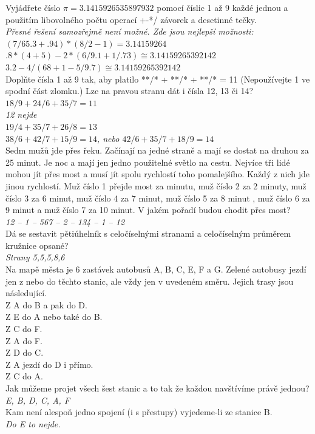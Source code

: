 \begin{multicols}{2}
\noindent
Vyjádřete číslo $\pi = 3.1415926535897932$ pomocí číslic 1 až 
9 každé jednou a použitím libovolného počtu operací +-*/ závorek 
a desetinné tečky.\\[1 mm]
{\sl Přesné řešení samozřejmě není možné. Zde jsou nejlepší možnosti:\\
$(7/65.3+.94)*(8/2-1) = 3.14159264$\\
$.8 * (4+5) - 2 * (6/9.1 + 1/.73) \cong 3.14159265392142$\\
$3.2-4/(68+1-5/9.7) \cong 3.14159265392142$}\\

\noindent
Doplňte čísla 1 až 9 tak, aby platilo **/* + **/* + **/* 
= 11 (Nepoužívejte 1 ve spodní část zlomku.) Lze na pravou
stranu dát i čísla 12, 13 či 14?
{\sl $18/9 + 24/6 + 35/7 = 11$\\
12 nejde\\
$19 / 4 + 35 / 7 + 26 / 8 = 13$\\
$38 / 6 + 42 / 7 + 15 / 9 = 14$, nebo 
$42 / 6 + 35 / 7 + 18 / 9 = 14$}\\

\noindent
Sedm mužů jde přes řeku. Začínají na jedné straně a mají 
se dostat na druhou za 25 minut. Je noc a mají jen jedno použitelné 
světlo na cestu. Nejvíce tři lidé mohou jít přes most a musí 
jít spolu rychlostí toho pomalejšího. Každý z nich jde jinou 
rychlostí. Muž číslo 1 přejde most za minutu, muž číslo 2 za 
2 minuty, muž číslo 3 za 6 minut, muž číslo 4 za 7 minut, muž 
číslo 5 za 8 minut , muž číslo 6 za 9 minut a muž číslo 7 za 
10 minut. V jakém pořadí budou chodit přes most?\\[1 mm]
{\sl 12 -- 1 -- 567 -- 2 -- 134 -- 1 -- 12}\\

\noindent
Dá se sestavit pětiúhelník s celočíselnými stranami a celočíselným 
průměrem kružnice opsané?\\[1 mm]
{\sl Strany 5,5,5,8,6}\\

\noindent
Na mapě města je 6 zastávek autobusů A, B, C, E, F a G. Zelené 
autobusy jezdí jen z nebo do těchto stanic, ale vždy jen v uvedeném 
směru. Jejich trasy jsou následující.\\
Z A do B a pak do D.\\
Z E do A nebo také do B.\\
Z C do F.\\
Z A do F.\\
Z D do C.\\
Z A jezdí do D i přímo.\\
Z C do A.\\[1 mm]
Jak můžeme projet všech šest stanic a to tak že každou navštívíme 
právě jednou?\\[1 mm]
{\sl E, B, D, C, A, F}\\
Kam není alespoň jedno spojení (i s přestupy) vyjedeme-li 
ze stanice B.\\[1 mm]
{\sl Do E to nejde.}\\


\end{multicols}
